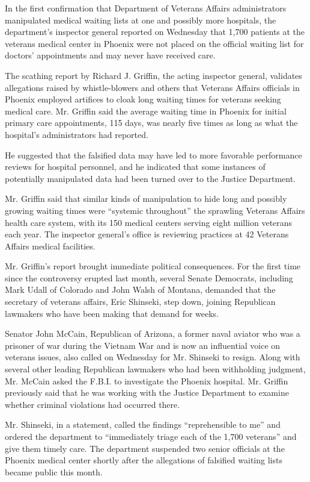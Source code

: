 In the first confirmation that Department of Veterans Affairs
administrators manipulated medical waiting lists at one and possibly
more hospitals, the department's inspector general reported on Wednesday
that 1,700 patients at the veterans medical center in Phoenix were not
placed on the official waiting list for doctors' appointments and may
never have received care.

The scathing report by Richard J. Griffin, the acting inspector general,
validates allegations raised by whistle-blowers and others that Veterans
Affairs officials in Phoenix employed artifices to cloak long waiting
times for veterans seeking medical care. Mr. Griffin said the average
waiting time in Phoenix for initial primary care appointments, 115 days,
was nearly five times as long as what the hospital's administrators had
reported.

He suggested that the falsified data may have led to more favorable
performance reviews for hospital personnel, and he indicated that some
instances of potentially manipulated data had been turned over to the
Justice Department.

Mr. Griffin said that similar kinds of manipulation to hide long and
possibly growing waiting times were ``systemic throughout'' the
sprawling Veterans Affairs health care system, with its 150 medical
centers serving eight million veterans each year. The inspector
general's office is reviewing practices at 42 Veterans Affairs medical
facilities.

Mr. Griffin's report brought immediate political consequences. For the
first time since the controversy erupted last month, several Senate
Democrats, including Mark Udall of Colorado and John Walsh of Montana,
demanded that the secretary of veterans affairs, Eric Shinseki, step
down, joining Republican lawmakers who have been making that demand for
weeks.

Senator John McCain, Republican of Arizona, a former naval aviator who
was a prisoner of war during the Vietnam War and is now an influential
voice on veterans issues, also called on Wednesday for Mr. Shinseki to
resign. Along with several other leading Republican lawmakers who had
been withholding judgment, Mr. McCain asked the F.B.I. to investigate
the Phoenix hospital. Mr. Griffin previously said that he was working
with the Justice Department to examine whether criminal violations had
occurred there.

Mr. Shinseki, in a statement, called the findings ``reprehensible to
me'' and ordered the department to ``immediately triage each of the
1,700 veterans'' and give them timely care. The department suspended two
senior officials at the Phoenix medical center shortly after the
allegations of falsified waiting lists became public this month.

